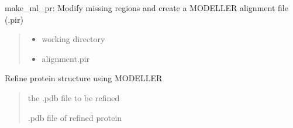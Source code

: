 \documentclass[letterpaper,10pt,english]{sphinxmanual}
\begin{document}
\begin{fulllineitems}
\begin{fulllineitems}
\begin{quote}
\begin{description}
\end{description}\end{quote}

\end{fulllineitems}


\begin{fulllineitems}
\label{\detokenize{checks:checks.CheckProtein.make_ml_pir}}
\pysigstartsignatures
{}
\pysigstopsignatures
\sphinxAtStartPar
make\_ml\_pr: Modify missing regions and create a MODELLER alignment file (.pir)
\begin{quote}\begin{description}
\begin{itemize}
\item {} 
\sphinxAtStartPar
{} \textendash{} working directory

\item {} 
\sphinxAtStartPar
{} \textendash{} alignment.pir

\end{itemize}

\end{description}\end{quote}

\end{fulllineitems}


\begin{fulllineitems}
\label{\detokenize{checks:checks.CheckProtein.refine_protein}}
\pysigstartsignatures
{}
\pysigstopsignatures
\sphinxAtStartPar
Refine protein structure using MODELLER
\begin{quote}\begin{description}
\sphinxAtStartPar
{} \textendash{} the .pdb file to be refined

\sphinxAtStartPar
.pdb file of refined protein

\end{description}\end{quote}

\end{fulllineitems}


\end{fulllineitems}
\end{document}

